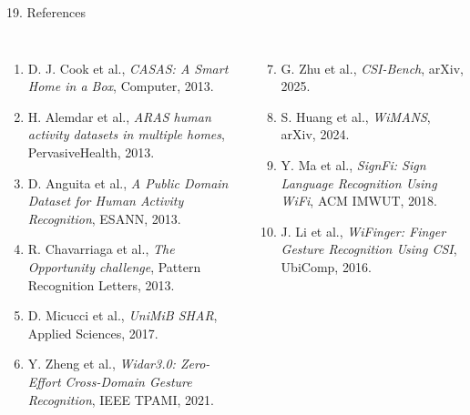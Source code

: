 \documentclass[aspectratio=169,11pt]{beamer}
\begin{document}

\begin{frame}{19. References}

\footnotesize %

\begin{columns}[T,totalwidth=\textwidth]


\begin{enumerate}
\setlength{\itemsep}{3pt} %

\item D. J. Cook et al.,
\textit{CASAS: A Smart Home in a Box},
Computer, 2013.

\item H. Alemdar et al.,
\textit{ARAS human activity datasets in multiple homes},
PervasiveHealth, 2013.

\item D. Anguita et al.,
\textit{A Public Domain Dataset for Human Activity Recognition},
ESANN, 2013.

\item R. Chavarriaga et al.,
\textit{The Opportunity challenge},
Pattern Recognition Letters, 2013.

\item D. Micucci et al.,
\textit{UniMiB SHAR},
Applied Sciences, 2017.

\item Y. Zheng et al.,
\textit{Widar3.0: Zero-Effort Cross-Domain Gesture Recognition},
IEEE TPAMI, 2021.

\end{enumerate}


\begin{enumerate}
\setcounter{enumi}{6}
\setlength{\itemsep}{3pt} %

\item G. Zhu et al.,
\textit{CSI-Bench},
arXiv, 2025.

\item S. Huang et al.,
\textit{WiMANS},
arXiv, 2024.

\item Y. Ma et al.,
\textit{SignFi: Sign Language Recognition Using WiFi},
ACM IMWUT, 2018.

\item J. Li et al.,
\textit{WiFinger: Finger Gesture Recognition Using CSI},
UbiComp, 2016.


\end{enumerate}
\end{columns}
\end{frame}
\end{document}
